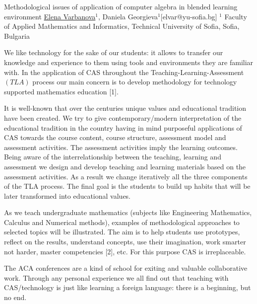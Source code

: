 


\begin{abstract_online}{Methodological issues of application of computer algebra in blended learning environment}{%
        \underline{Elena Varbanova}$^{1}$, Daniela Georgieva$^{1}$}{[elvar@yu-sofia.bg]
        }{%
        $^1$ Faculty of Applied Mathematics and Informatics, Technical University of Sofia, Sofia, Bulgaria }

We like technology for the sake of our students: it allows to transfer our knowledge and experience to them using tools and environments they are familiar with. In the application of CAS throughout the Teaching-Learning-Assessment $(TLA)$ process our main concern is to develop methodology for technology supported mathematics education [1].

It is well-known that over the centuries unique values and educational tradition have been created. We try to give contemporary/modern interpretation of the educational tradition in the country having in mind purposeful applications of CAS towards the course content, course structure, assessment model and assessment activities. The assessment activities imply the learning outcomes. Being aware of the interrelationship between the teaching, learning and assessment we design and develop teaching and learning materials based on the assessment activities. As a result we change iteratively all the three components of the TLA process. The final goal is the students to build up habits that will be later transformed into educational values.

As we teach undergraduate mathematics (subjects like Engineering Mathematics, Calculus and Numerical methods), examples of methodological approaches to selected topics will be illustrated.  The aim is to help students use prototypes, reflect on the results, understand concepts, use their imagination, work smarter not harder, master competencies [2], etc. For this purpose CAS is irreplaceable.

The ACA conferences are a kind of school for exiting and valuable collaborative work. Through any personal experience we all find out that teaching with CAS/technology is just like learning a foreign language: there is a beginning, but no end.


\end{abstract_online}
